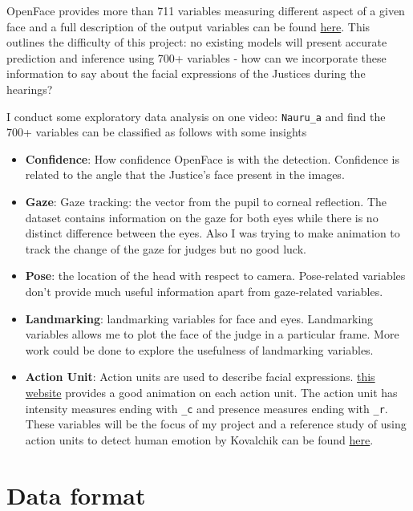 \documentclass{monashthesis}
\begin{document}
OpenFace provides more than 711 variables measuring different aspect of a given face and a full description of the output variables can be found \href{https://github.com/TadasBaltrusaitis/OpenFace/wiki/Action-Units}{here}. This outlines the difficulty of this project: no existing models will present accurate prediction and inference using 700+ variables - how can we incorporate these information to say about the facial expressions of the Justices during the hearings?

I conduct some exploratory data analysis on one video: \texttt{Nauru\_a} and find the 700+ variables can be classified as follows with some insights

\begin{itemize}
\item
  \textbf{Confidence}: How confidence OpenFace is with the detection. Confidence is related to the angle that the Justice's face present in the images.
\item
  \textbf{Gaze}: Gaze tracking: the vector from the pupil to corneal reflection. The dataset contains information on the gaze for both eyes while there is no distinct difference between the eyes. Also I was trying to make animation to track the change of the gaze for judges but no good luck.
\item
  \textbf{Pose}: the location of the head with respect to camera. Pose-related variables don't provide much useful information apart from gaze-related variables.
\item
  \textbf{Landmarking}: landmarking variables for face and eyes. Landmarking variables allows me to plot the face of the judge in a particular frame. More work could be done to explore the usefulness of landmarking variables.
\item
  \textbf{Action Unit}: Action units are used to describe facial expressions. \href{https://imotions.com/blog/facial-action-coding-system/}{this website} provides a good animation on each action unit. The action unit has intensity measures ending with \texttt{\_c} and presence measures ending with \texttt{\_r}. These variables will be the focus of my project and a reference study of using action units to detect human emotion by Kovalchik can be found \href{http://www.sloansportsconference.com/wp-content/uploads/2018/02/2005.pdf}{here}.
\end{itemize}

\hypertarget{data-format}{%
\section{Data format}\label{data-format}}
\end{document}

